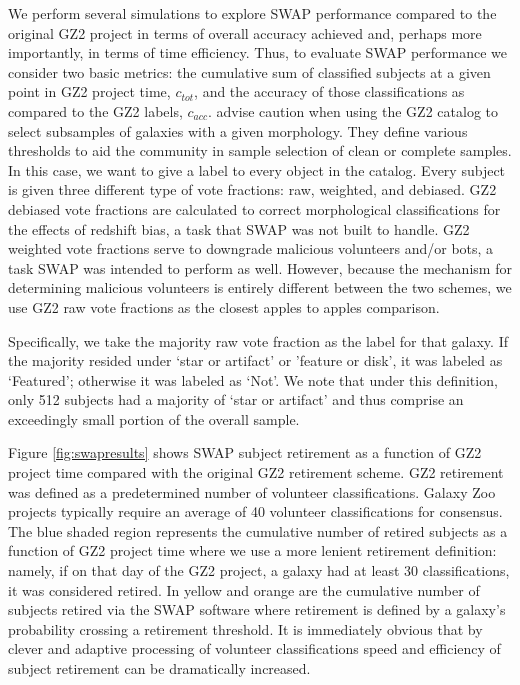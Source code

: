 \documentclass[twocolumn]{aastex6}
\begin{document}
We perform several simulations to explore SWAP performance compared to the
original GZ2 project in terms of overall accuracy achieved and, perhaps more importantly, 
in terms of time efficiency. Thus, to evaluate SWAP performance we consider two basic metrics:
the cumulative sum of classified subjects at a given point in GZ2 project time, $c_{tot}$, and the 
accuracy of those classifications as compared to the GZ2  labels, $c_{acc}$. \citep{Willett2013}
advise caution when using the GZ2 catalog to select subsamples of galaxies with a given
morphology.  They define various thresholds to aid the community in sample selection of
clean or complete samples. In this case, we want to give a label to every object in the catalog. 
Every subject is given three different type of vote fractions: raw, weighted, and debiased. 
GZ2 debiased vote fractions are calculated to correct morphological classifications for the
 effects of redshift bias, a task that SWAP was not built to handle. 
GZ2 weighted vote fractions serve to downgrade malicious volunteers and/or bots, a task
SWAP was intended to perform as well.  However, because the mechanism for
determining malicious volunteers is entirely different between the two schemes, we 
use GZ2 raw vote fractions as the closest apples to apples comparison. 

Specifically, we take the majority raw vote fraction as the label for that galaxy. If the 
majority resided under `star or artifact' or 'feature or disk', it was labeled as `Featured'; 
otherwise it was labeled as `Not'. We note that under this definition, only 512 subjects
had a majority of `star or artifact' and thus comprise an exceedingly small portion of the
overall sample. 

Figure \ref{fig:swapresults} shows SWAP subject retirement as a function of GZ2
project time compared with the original GZ2 retirement scheme. GZ2 retirement was 
defined as a predetermined number of volunteer classifications. Galaxy Zoo projects
typically require an average of 40 volunteer classifications for consensus. The blue
shaded region represents the cumulative number of retired subjects as a function
of GZ2 project time where we use a more lenient retirement definition: 
namely, if on that day of the GZ2 project, a galaxy had at least 30 classifications, 
it was considered retired. 
 In yellow and orange are the cumulative number of subjects retired
via the SWAP software where retirement is defined by a galaxy's probability
crossing a retirement threshold.  It is immediately obvious that by clever and adaptive 
processing of volunteer classifications speed and efficiency of subject retirement
can be dramatically increased. 
\end{document}
